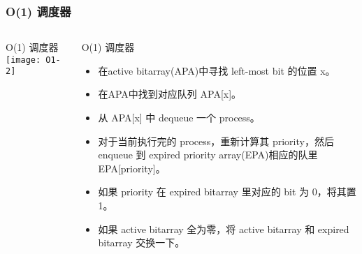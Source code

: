 \begin{frame}
	\frametitle{ O(1) 调度器}
	\begin{columns}
		\begin{column}{.4\textwidth}
			\Large \centering
			O(1) 调度器
			\texttt{[image: O1-2]}
			
		\end{column}
		
		\begin{column}{.6\textwidth}
			O(1) 调度器\\
			
			\begin{itemize}
				\item 在active bitarray(APA)中寻找 left-most bit 的位置 x。
			\item 在APA中找到对应队列 APA[x]。
			\item 从 APA[x] 中 dequeue 一个 process。
			\item 对于当前执行完的 process，重新计算其 priority，然后 enqueue 到 expired priority array(EPA)相应的队里 EPA[priority]。
			\item 如果 priority 在 expired bitarray 里对应的 bit 为 0，将其置 1。
			\item 如果 active bitarray 全为零，将 active bitarray 和 expired bitarray 交换一下。
			\end{itemize}
		\end{column}
	\end{columns}
\end{frame}

